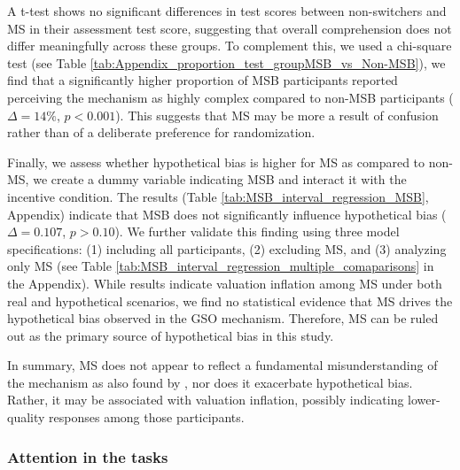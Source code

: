 \documentclass[12pt]{article}
\begin{document}
A t-test shows no significant differences in test scores between non-switchers and MS in their assessment test score, suggesting that overall comprehension does not differ meaningfully across these groups. To complement this, we used a chi-square test (see Table \ref{tab:Appendix_proportion_test_groupMSB_vs_Non-MSB}), we find that a significantly higher proportion of MSB participants reported perceiving the mechanism as highly complex compared to non-MSB participants (\(\Delta = 14\%\), \(p < 0.001\)). This suggests that MS may be more a result of confusion rather than of a deliberate preference for randomization.


Finally, we assess whether hypothetical bias is higher for MS as compared to non-MS, we create a dummy variable indicating MSB and interact it with the incentive condition. The results (Table \ref{tab:MSB_interval_regression_MSB}, Appendix) indicate that MSB does not significantly influence hypothetical bias (\(\Delta = 0.107\), \(p > 0.10\)). We further validate this finding using three model specifications: (1) including all participants, (2) excluding MS, and (3) analyzing only MS (see Table \ref{tab:MSB_interval_regression_multiple_comaparisons} in the Appendix). While results indicate valuation inflation among MS under both real and hypothetical scenarios, we find no statistical evidence that MS drives the hypothetical bias observed in the GSO mechanism. Therefore, MS can be ruled out as the primary source of hypothetical bias in this study.

In summary, MS does not appear to reflect a fundamental misunderstanding of the mechanism as also found by \citet{yu2021multiple}, nor does it exacerbate hypothetical bias. Rather, it may be associated with valuation inflation, possibly indicating lower-quality responses among those participants.




\subsubsection{Attention in the tasks}
\end{document}
